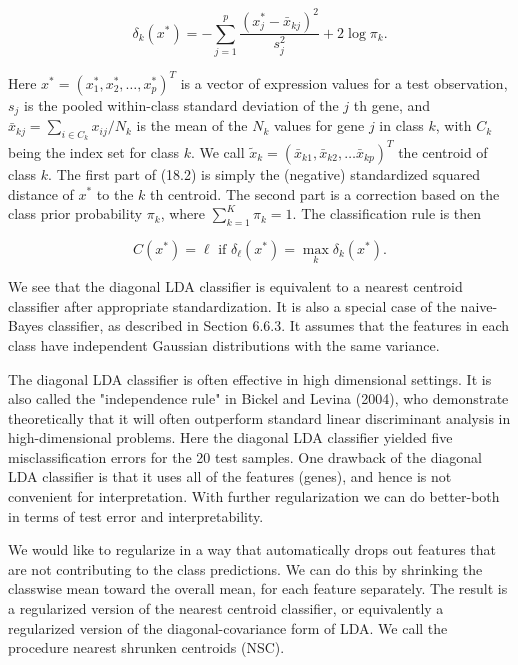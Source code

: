 \documentclass[10pt]{article}
\begin{document}
\begin{equation*}
\delta_{k}\left(x^{*}\right)=-\sum_{j=1}^{p} \frac{\left(x_{j}^{*}-\bar{x}_{k j}\right)^{2}}{s_{j}^{2}}+2 \log \pi_{k} . \tag{18.2}
\end{equation*}


Here $x^{*}=\left(x_{1}^{*}, x_{2}^{*}, \ldots, x_{p}^{*}\right)^{T}$ is a vector of expression values for a test observation, $s_{j}$ is the pooled within-class standard deviation of the $j$ th gene, and $\bar{x}_{k j}=\sum_{i \in C_{k}} x_{i j} / N_{k}$ is the mean of the $N_{k}$ values for gene $j$ in class $k$, with $C_{k}$ being the index set for class $k$. We call $\tilde{x}_{k}=\left(\bar{x}_{k 1}, \bar{x}_{k 2}, \ldots \bar{x}_{k p}\right)^{T}$ the centroid of class $k$. The first part of (18.2) is simply the (negative) standardized squared distance of $x^{*}$ to the $k$ th centroid. The second part is a correction based on the class prior probability $\pi_{k}$, where $\sum_{k=1}^{K} \pi_{k}=1$. The classification rule is then


\begin{equation*}
C\left(x^{*}\right)=\ell \text { if } \delta_{\ell}\left(x^{*}\right)=\max _{k} \delta_{k}\left(x^{*}\right) . \tag{18.3}
\end{equation*}


We see that the diagonal LDA classifier is equivalent to a nearest centroid classifier after appropriate standardization. It is also a special case of the naive-Bayes classifier, as described in Section 6.6.3. It assumes that the features in each class have independent Gaussian distributions with the same variance.

The diagonal LDA classifier is often effective in high dimensional settings. It is also called the "independence rule" in Bickel and Levina (2004), who demonstrate theoretically that it will often outperform standard linear discriminant analysis in high-dimensional problems. Here the diagonal LDA classifier yielded five misclassification errors for the 20 test samples. One drawback of the diagonal LDA classifier is that it uses all of the features (genes), and hence is not convenient for interpretation. With further regularization we can do better-both in terms of test error and interpretability.

We would like to regularize in a way that automatically drops out features that are not contributing to the class predictions. We can do this by shrinking the classwise mean toward the overall mean, for each feature separately. The result is a regularized version of the nearest centroid classifier, or equivalently a regularized version of the diagonal-covariance form of LDA. We call the procedure nearest shrunken centroids (NSC).
\end{document}
